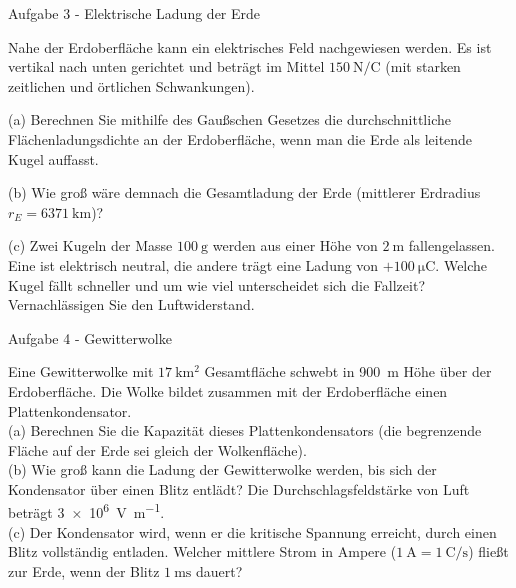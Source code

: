 \begin{frame}[t]{Aufgabe 3 - Elektrische Ladung der Erde}

Nahe der Erdoberfläche kann ein elektrisches Feld nachgewiesen werden. Es ist vertikal nach unten
gerichtet und beträgt im Mittel $\SI{150}{\newton\per\coulomb}$ (mit starken zeitlichen und örtlichen Schwankungen).

(a) Berechnen Sie mithilfe des Gaußschen Gesetzes die durchschnittliche Flächenladungsdichte
an der Erdoberfläche, wenn man die Erde als leitende Kugel auffasst.

(b) Wie groß wäre demnach die Gesamtladung der Erde (mittlerer Erdradius $r_E = \SI{6371}{\kilo\meter}$)?

(c) Zwei Kugeln der Masse $\SI{100}{\gram}$ werden aus einer Höhe von $\SI{2}{\meter}$ fallengelassen. Eine ist elektrisch
neutral, die andere trägt eine Ladung von $+\SI{100}{\micro\coulomb}$. Welche Kugel fällt schneller und um wie
viel unterscheidet sich die Fallzeit? Vernachlässigen Sie den Luftwiderstand.

\end{frame}


\begin{frame}[t]{Aufgabe 4 - Gewitterwolke}

Eine Gewitterwolke mit $\SI{17}{\kilo\meter\squared}$ Gesamtfläche schwebt in \SI{900}{\meter} Höhe über der Erdoberfläche. Die
Wolke bildet zusammen mit der Erdoberfläche einen Plattenkondensator.\\

(a) Berechnen Sie die Kapazität dieses Plattenkondensators (die begrenzende Fläche auf der Erde
sei gleich der Wolkenfläche).\\

(b) Wie groß kann die Ladung der Gewitterwolke werden, bis sich der Kondensator über einen
Blitz entlädt? Die Durchschlagsfeldstärke von Luft beträgt \SI{3e6}{\volt\per\meter}.\\

(c) Der Kondensator wird, wenn er die kritische Spannung erreicht, durch einen Blitz vollständig
entladen. Welcher mittlere Strom in Ampere ($\SI{1}{\ampere} = \SI{1}{\coulomb\per\second}$) fließt zur Erde, wenn der Blitz
$\SI{1}{\milli\second}$ dauert?
\end{frame}
